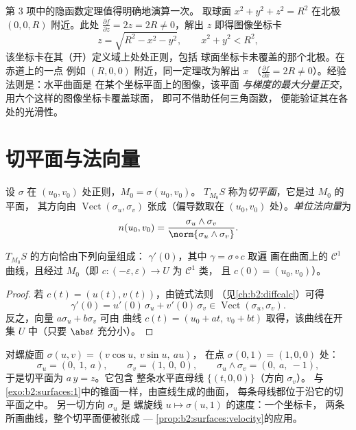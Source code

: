 \begin{example}[从水平集到图像]
\label{ex:b2:surfaces:levelgraph}
第 3 项中的隐函数定理值得明确地演算一次。
取球面 $x^2 + y^2 + z^2 = R^2$ 在北极
$(0, 0, R)$ 附近。此处 $\frac{\partial f}{\partial z} = 2z =
2R \neq 0$，解出 $z$ 即得图像坐标卡
\[
z = \sqrt{R^2 - x^2 - y^2},
\qquad x^2 + y^2 < R^2 ,
\]
该坐标卡在其（开）定义域上处处正则，包括
球面坐标卡未覆盖的那个北极。在赤道上的一点
例如 $(R, 0, 0)$ 附近，同一定理改为解出 $x$
（$\frac{\partial f}{\partial x} = 2R \neq 0$）。经验法则是：水平曲面是
在某个坐标平面上的图像，该平面
\emph{与梯度的最大分量正交}，
用六个这样的图像坐标卡覆盖球面，
即可不借助任何三角函数，
便能验证其在各处的光滑性。
\end{example}

\section{切平面与法向量}

\begin{definition}[切平面]\label{def:b2:surfaces:tangent}
设 $\sigma$ 在 $(u_0, v_0)$ 处正则，$M_0 = \sigma(u_0, v_0)$。
$T_{M_0}S$ 称为\emph{切平面}，它是过 $M_0$ 的平面，
其方向由 $\operatorname{Vect}(\sigma_u, \sigma_v)$ 张成（偏导数取在
$(u_0, v_0)$ 处）。\emph{单位法向量}为
\[
n(u_0, v_0)
= \frac{\sigma_u \wedge \sigma_v}
       {\norm{\sigma_u \wedge \sigma_v}} .
\]
\end{definition}

\begin{proposition}[切向量是速度
向量]\label{prop:b2:surfaces:velocity}
$T_{M_0}S$ 的方向恰由下列向量组成：
$\gamma'(0)$，其中 $\gamma = \sigma \circ c$ 取遍
画在曲面上的 $\mathcal{C}^1$ 曲线，且经过 $M_0$（即
$c \colon (-\varepsilon, \varepsilon) \to U$ 为 $\mathcal{C}^1$ 类，
且 $c(0) = (u_0, v_0)$）。
\end{proposition}

\begin{proof}
若 $c(t) = (u(t), v(t))$，由链式法则
（见\cref{ch:b2:diffcalc}）可得
\[
\gamma'(0) = u'(0)\,\sigma_u + v'(0)\,\sigma_v
\in \operatorname{Vect}(\sigma_u, \sigma_v).
\]
反之，向量 $a\sigma_u + b\sigma_v$ 可由
曲线 $c(t) = (u_0 + at,\ v_0 + bt)$ 取得，该曲线在开集
$U$ 中（只要 $\abs t$ 充分小）。
\end{proof}

\begin{example}[螺旋面的切平面]
\label{ex:b2:surfaces:helicoidtangent}
对螺旋面 $\sigma(u, v) = (v\cos u,\ v\sin u,\ au)$，
在点 $\sigma(0, 1) = (1, 0, 0)$ 处：
\[
\sigma_u = (0,\ 1,\ a), \qquad \sigma_v = (1,\ 0,\ 0),
\qquad
\sigma_u \wedge \sigma_v = (0,\ a,\ -1),
\]
于是切平面为 $a\,y = z$。它包含
整条水平直母线 $\{(t, 0, 0)\}$（方向 $\sigma_v$）。
与\cref{exo:b2:surfaces:1}中的锥面一样，由直线生成的曲面，
每条母线都位于沿它的切平面之中。
另一切方向 $\sigma_u$ 是
螺旋线 $u \mapsto \sigma(u, 1)$ 的速度：一个坐标卡，
两条所画曲线，整个切平面便被张成 ---
\cref{prop:b2:surfaces:velocity}的应用。
\end{example}

